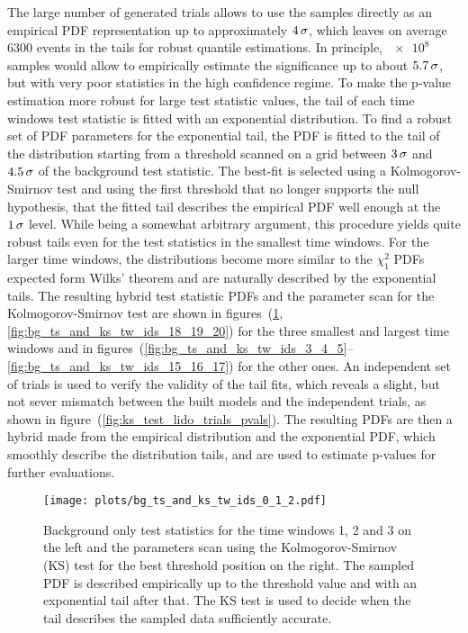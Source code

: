 The large number of generated trials allows to use the samples directly as an empirical PDF representation up to approximately $\num{4}\,\sigma$, which leaves on average $\num{6300}$ events in the tails for robust quantile estimations.
In principle, $\num{e8}$ samples would allow to empirically estimate the significance up to about $\num{5.7}\,\sigma$, but with very poor statistics in the high confidence regime.
To make the p-value estimation more robust for large test statistic values, the tail of each time windows test statistic is fitted with an exponential distribution.
To find a robust set of PDF parameters for the exponential tail, the PDF is fitted to the tail of the distribution starting from a threshold scanned on a grid between $\num{3}\,\sigma$ and $\num{4.5}\,\sigma$ of the background test statistic.
The best-fit is selected using a Kolmogorov-Smirnov test \cite{Horn:1977KSTest} and using the first threshold that no longer supports the null hypothesis, that the fitted tail describes the empirical PDF well enough at the $\num{1}\,\sigma$ level.
While being a somewhat arbitrary argument, this procedure yields quite robust tails even for the test statistics in the smallest time windows.
For the larger time windows, the distributions become more similar to the $\chi^2_1$ PDFs expected form Wilks' theorem and are naturally described by the exponential tails.
The resulting hybrid test statistic PDFs and the parameter scan for the Kolmogorov-Smirnov test are shown in figures~(\ref{fig:bg_ts_and_ks_tw_ids_0_1_2},\ref{fig:bg_ts_and_ks_tw_ids_18_19_20}) for the three smallest and largest time windows and in figures~(\ref{fig:bg_ts_and_ks_tw_ids_3_4_5}--\ref{fig:bg_ts_and_ks_tw_ids_15_16_17}) for the other ones.
An independent set of trials is used to verify the validity of the tail fits, which reveals a slight, but not sever mismatch between the built models and the independent trials, as shown in figure~(\ref{fig:ks_test_lido_trials_pvals}).
The resulting PDFs are then a hybrid made from the empirical distribution and the exponential PDF, which smoothly describe the distribution tails, and are used to estimate p-values for further evaluations.

\begin{figure}[htbp]
  \centering
  \texttt{[image: plots/bg\_ts\_and\_ks\_tw\_ids\_0\_1\_2.pdf]}
  \caption[Background test statistics for the time windows 1, 2 and 3]{
    Background only test statistics for the time windows 1, 2 and 3 on the left and the parameters scan using the Kolmogorov-Smirnov (KS) test for the best threshold position on the right.
    The sampled PDF is described empirically up to the threshold value and with an exponential tail after that.
    The KS test is used to decide when the tail describes the sampled data sufficiently accurate.
  }
  \label{fig:bg_ts_and_ks_tw_ids_0_1_2}
\end{figure}

